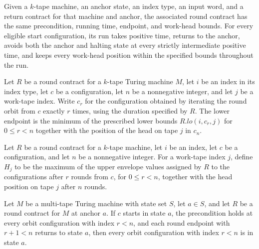 \begin{definition}
\label{Turing.ReturnContract.toRound}
\leanok
{}
Given a $k$-tape machine, an anchor state, an index type, an input word, and a return
contract for that machine and anchor, the associated round contract has the same
precondition, running time, endpoint, and work-head bounds. For every eligible start
configuration, its run takes positive time, returns to the anchor, avoids both the
anchor and halting state at every strictly intermediate positive time, and keeps every
work-head position within the specified bounds throughout the run.
\end{definition}

\begin{definition}
\label{Turing.RoundContract.hullLo}
\leanok
{}
Let $R$ be a round contract for a $k$-tape Turing machine $M$, let $i$ be an index in
its index type, let $c$ be a configuration, let $n$ be a nonnegative integer, and let
$j$ be a work-tape index. Write $c_r$ for the configuration obtained by iterating the
round orbit from $c$ exactly $r$ times, using the duration specified by $R$. The lower
endpoint is the minimum of the prescribed lower bounds $R.lo(i,c_r,j)$ for $0 \le r < n$
together with the position of the head on tape $j$ in $c_n$.
\end{definition}

\begin{definition}
\label{Turing.RoundContract.hullHi}
\leanok
{}
Let $R$ be a round contract for a $k$-tape machine, let $i$ be an index, let $c$ be a
configuration, and let $n$ be a nonnegative integer. For a work-tape index $j$, define
$H_j$ to be the maximum of the upper envelope values assigned by $R$ to the
configurations after $r$ rounds from $c$, for $0 \le r < n$, together with the head
position on tape $j$ after $n$ rounds.
\end{definition}

\begin{theorem}
\label{Turing.RoundContract.orbit_anchor}
\leanok
{}
Let $M$ be a multi-tape Turing machine with state set $S$, let $a\in S$, and let $R$ be
a round contract for $M$ at anchor $a$. If $c$ starts in state $a$, the precondition
holds at every orbit configuration with index $r<n$, and each round endpoint with
$r+1<n$ returns to state $a$, then every orbit configuration with index $r<n$ is in
state $a$.
\end{theorem}

